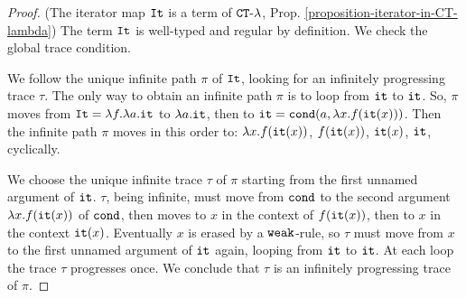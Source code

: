 




\begin{proof}
(The iterator map ${\tt It}$ is a term of ${ {\tt CT}\mbox{-}\lambda}$, 
Prop. \ref{proposition-iterator-in-CT-lambda})
The term ${\tt It}$ is well-typed and regular by definition. 
We check the global trace condition. 

We follow the unique infinite path $\pi$ of ${\tt It}$, looking for an
infinitely progressing trace $\tau$. 
The only way to obtain an infinite path $\pi$ is to loop
from ${\tt it}$ to ${\tt it}$.
So, $\pi$ moves from  ${\tt It} = \lambda f. \lambda a.{\tt it}$
to $\lambda a.{\tt it}$, then to ${\tt it} = {\tt cond} (a, \lambda x.f({\tt it}(x)))$.
Then the infinite path $\pi$ moves in this order to:
 $\lambda x.f({\tt it}(x))$, $f({\tt it}(x))$, $ {\tt it}(x)$, ${\tt it}$, cyclically.
 
We choose the unique infinite trace $\tau$ of $\pi$ starting from the first unnamed argument of ${\tt it}$. $\tau$, being infinite, must move
 from ${\tt cond}$ to the second argument 
$\lambda x.f({\tt it}(x))$ of ${\tt cond}$, then moves to $x$ in the context of 
$f({\tt it}(x))$, then to $x$ in the context ${\tt it}(x)$. Eventually $x$ is erased
by a ${\tt weak}$-rule, so $\tau$ must move from $x$ 
to the first unnamed argument of ${\tt it}$ again, looping from ${\tt it}$ to ${\tt it}$. 
At each loop the trace $\tau$ 
progresses once. We conclude that $\tau$ is an infinitely progressing 
trace of $\pi$.
\end{proof}



